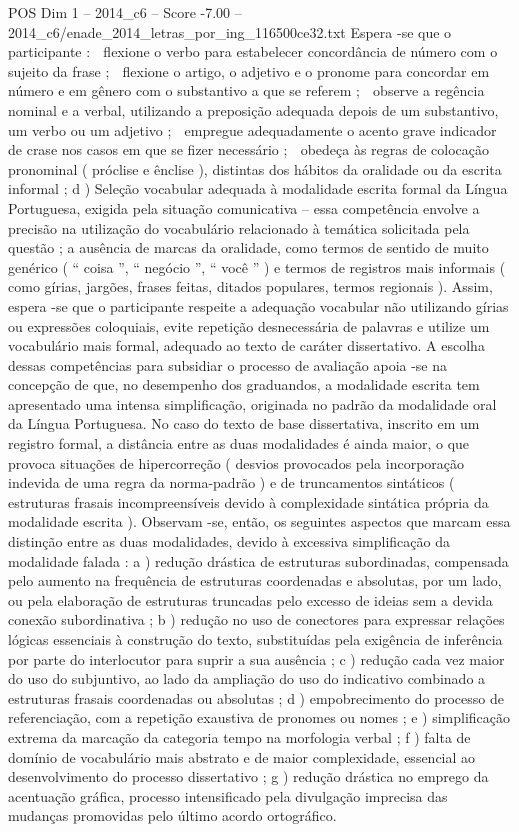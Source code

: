 \begin{textsample}{POS Dim 1 – 2014\_c6 – Score -7.00 – 2014\_c6/enade\_2014\_letras\_por\_ing\_116500ce32.txt}
Espera -se que o participante :  flexione o verbo para estabelecer concordância de número com o sujeito da frase ;  flexione o artigo, o adjetivo e o pronome para concordar em número e em gênero com o substantivo a que se referem ;  observe a regência nominal e a verbal, utilizando a preposição adequada depois de um substantivo, um verbo ou um adjetivo ;  empregue adequadamente o acento grave indicador de crase nos casos em que se fizer necessário ;  obedeça às regras de colocação pronominal ( próclise e ênclise ), distintas dos hábitos da oralidade ou da escrita informal ; d ) Seleção vocabular adequada à modalidade escrita formal da Língua Portuguesa, exigida pela situação comunicativa – essa competência envolve a precisão na utilização do vocabulário relacionado à temática solicitada pela questão ; a ausência de marcas da oralidade, como termos de sentido de muito genérico ( “ coisa ”, “ negócio ”, “ você ” ) e termos de registros mais informais ( como gírias, jargões, frases feitas, ditados populares, termos regionais ).
Assim, espera -se que o participante respeite a adequação vocabular não utilizando gírias ou expressões coloquiais, evite repetição desnecessária de palavras e utilize um vocabulário mais formal, adequado ao texto de caráter dissertativo.
A escolha dessas competências para subsidiar o processo de avaliação apoia -se na concepção de que, no desempenho dos graduandos, a modalidade escrita tem apresentado uma intensa simplificação, originada no padrão da modalidade oral da Língua Portuguesa.
No caso do texto de base dissertativa, inscrito em um registro formal, a distância entre as duas modalidades é ainda maior, o que provoca situações de hipercorreção ( desvios provocados pela incorporação indevida de uma regra da norma-padrão ) e de truncamentos sintáticos ( estruturas frasais incompreensíveis devido à complexidade sintática própria da modalidade escrita ).
Observam -se, então, os seguintes aspectos que marcam essa distinção entre as duas modalidades, devido à excessiva simplificação da modalidade falada : a ) redução drástica de estruturas subordinadas, compensada pelo aumento na frequência de estruturas coordenadas e absolutas, por um lado, ou pela elaboração de estruturas truncadas pelo excesso de ideias sem a devida conexão subordinativa ; b ) redução no uso de conectores para expressar relações lógicas essenciais à construção do texto, substituídas pela exigência de inferência por parte do interlocutor para suprir a sua ausência ; c ) redução cada vez maior do uso do subjuntivo, ao lado da ampliação do uso do indicativo combinado a estruturas frasais coordenadas ou absolutas ; d ) empobrecimento do processo de referenciação, com a repetição exaustiva de pronomes ou nomes ; e ) simplificação extrema da marcação da categoria tempo na morfologia verbal ; f ) falta de domínio de vocabulário mais abstrato e de maior complexidade, essencial ao desenvolvimento do processo dissertativo ; g ) redução drástica no emprego da acentuação gráfica, processo intensificado pela divulgação imprecisa das mudanças promovidas pelo último acordo ortográfico.

\end{textsample}

